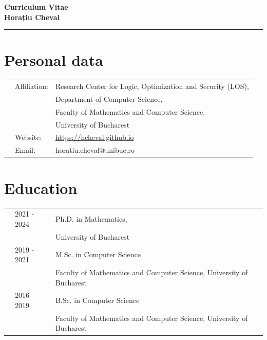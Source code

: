 \documentclass[letterpaper,11pt,oneside]{article}
\begin{document}

\noindent  \huge{\textbf{Curriculum Vitae \\ Horațiu Cheval}}  \\
\vspace{-2ex}
\hrule
\normalsize




\vspace{1em}



\noindent
\section{Personal data}
\normalsize 
\begin{tabular}{@{} l l l}
    &Affiliation:& Research Center for Logic, Optimization and Security (LOS), \\ 
    && Department of Computer Science, \\ 
    && Faculty of Mathematics and Computer Science, \\ 
    && University of Bucharest \\ 
    &Website:& \url{https://hcheval.github.io} \\ 
    &Email:& horatiu.cheval@unibuc.ro
\end{tabular}


\noindent
\section{Education} 
\normalsize
\begin{tabular}{@{} l l l}
    & 2021 - 2024 & Ph.D. in Mathematics, \\ 
    &                & University of Bucharest \\
    & 2019 - 2021 & M.Sc. in Computer Science \\  
    &                & Faculty of Mathematics and Computer Science, University of Bucharest \\
    & 2016 - 2019    & B.Sc. in Computer Science \\
    &                & Faculty of Mathematics and Computer Science, University of Bucharest \\

\end{tabular}
\end{document}
